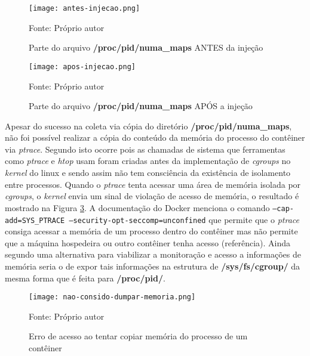 \begin{figure}[htb!]
\footnotesize
\caption{Parte do arquivo \textbf{/proc/pid/numa\_maps} ANTES da injeção }
\texttt{[image: antes-injecao.png]}
\centering
\label{fig:antes-injecao}
\begin{center}
Fonte: Próprio autor 
\end{center}
\end{figure}


\begin{figure}[htb!]
\footnotesize
\caption{Parte do arquivo \textbf{/proc/pid/numa\_maps} APÓS a injeção }
\texttt{[image: apos-injecao.png]}
\centering
\label{fig:apos-injecao}
\begin{center}
Fonte: Próprio autor 
\end{center}
\end{figure}

%
Apesar do sucesso na coleta via cópia do diretório \textbf{/proc/pid/numa\_maps}, não foi possível realizar a cópia do conteúdo da memória do processo do contêiner via \textit{ptrace}. 
%
Segundo \cite{cgroupsxptrace} isto ocorre pois as chamadas de sistema que ferramentas como \textit{ptrace} e \textit{htop} usam foram criadas antes da implementação de \textit{cgroups} no \textit{kernel} do linux e sendo assim não tem consciência da existência de isolamento entre processos.
%
Quando o \textit{ptrace} tenta acessar uma área de memória isolada por \textit{cgroups}, o \textit{kernel} envia um sinal de violação de acesso de memória, o resultado é mostrado na Figura \ref{fig:erro-copia-gdb}.
%
A documentação do Docker \cite{capabilities} menciona o comando \texttt{--cap-add=SYS_PTRACE --security-opt-seccomp=unconfined} que permite que o \textit{ptrace} consiga acessar a memória de um processo dentro do contêiner mas não permite que a máquina hospedeira ou outro contêiner tenha acesso (referência).
%
Ainda segundo \cite{cgroupsxptrace} uma alternativa para viabilizar a monitoração e acesso a informações de memória seria o de expor tais informações na estrutura de \textbf{/sys/fs/cgroup/} da mesma forma que é feita para \textbf{/proc/pid/}.


\begin{figure}[htb!]
\footnotesize
\caption{Erro de acesso ao tentar copiar memória do processo de um contêiner}
\texttt{[image: nao-consido-dumpar-memoria.png]}
\centering
\label{fig:erro-copia-gdb}
\begin{center}
Fonte: Próprio autor 
\end{center}
\end{figure}


